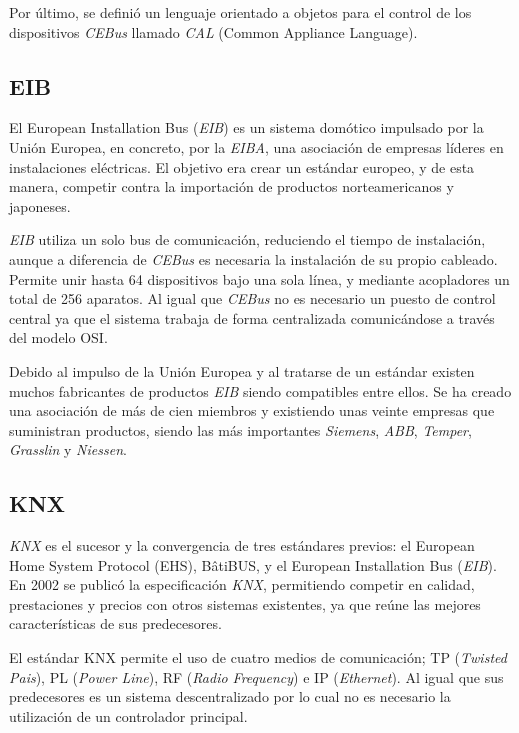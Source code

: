 Por último, se definió un lenguaje orientado a objetos para el control de los dispositivos \emph{CEBus} llamado \emph{CAL} (Common Appliance Language).

\subsection{EIB}

El European Installation Bus (\emph{EIB}) es un sistema domótico impulsado por la Unión Europea, en concreto, por la \emph{EIBA}, una asociación de empresas líderes en instalaciones eléctricas. El objetivo era crear un estándar europeo, y de esta manera, competir contra la importación de productos norteamericanos y japoneses.

\emph{EIB} utiliza un solo bus de comunicación, reduciendo el tiempo de instalación, aunque a diferencia de \emph{CEBus} es necesaria la instalación de su propio cableado. Permite unir hasta 64 dispositivos bajo una sola línea, y mediante acopladores un total de 256 aparatos. Al igual que \emph{CEBus} no es necesario un puesto de control central ya que el sistema trabaja de forma centralizada comunicándose a través del modelo OSI.

Debido al impulso de la Unión Europea y al tratarse de un estándar existen muchos fabricantes de productos \emph{EIB} siendo compatibles entre ellos. Se ha creado una asociación de más de cien miembros y existiendo unas veinte empresas que suministran productos, siendo las más importantes \emph{Siemens}, \emph{ABB}, \emph{Temper}, \emph{Grasslin} y \emph{Niessen}.

\subsection{KNX}

\emph{KNX} es el sucesor y la convergencia de tres estándares previos: el European Home System Protocol (EHS), BâtiBUS, y el European Installation Bus (\emph{EIB}). En 2002 se publicó la especificación \emph{KNX}, permitiendo competir en calidad, prestaciones y precios con otros sistemas existentes, ya que reúne las mejores características de sus predecesores.


El estándar KNX permite el uso de cuatro medios de comunicación; TP (\emph{Twisted Pais}), PL (\emph{Power Line}), RF (\emph{Radio Frequency}) e IP (\emph{Ethernet}). Al igual que sus predecesores es un sistema descentralizado por lo cual no es necesario la utilización de un controlador principal.